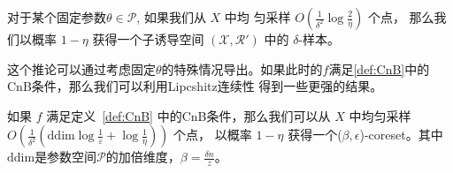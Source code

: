 \begin{corollary}
    对于某个固定参数$\theta \in \mathcal{P}$, 如果我们从 $X$ 中均
    匀采样 $O\left(\frac{1}{\delta^2}  \log \frac{2}{\eta}\right)$ 个点，
    那么我们以概率 $1 - \eta$ 获得一个子诱导空间 $(\mathcal{X}, \mathcal{R}')$ 中的 $\delta$-样本。
    \label{cor:fixed theta}
\end{corollary}   

这个推论可以通过考虑固定$\theta$的特殊情况导出。如果此时的$f$满足\ref{def:CnB}中的CnB条件，那么我们可以利用Lipcshitz连续性
得到一些更强的结果。

\begin{theorem}
    如果 $f$ 满足定义~\ref{def:CnB} 中的CnB条件，那么我们可以从 $X$ 中均匀采样 $O\left(\frac{1}{\delta^2} \left(\text{ddim}\log \frac 1 \varepsilon + \log \frac{1}{\eta}\right)\right)$ 个点，
    以概率 $1 - \eta$ 获得一个($\beta, \epsilon$)-coreset。其中$\text{ddim}$是参数空间$\mathcal{P}$的加倍维度，$\beta = \frac{\delta n}{z}$。
    \label{thm:uniform}
\end{theorem}
